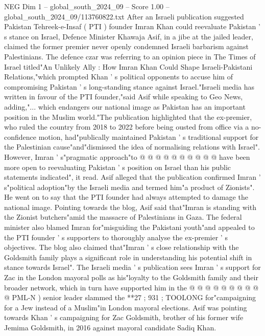 \begin{textsample}{NEG Dim 1 – global\_south\_2024\_09 – Score 1.00 – global\_south\_2024\_09/113760822.txt}  \label{ex:f1_neg_424}
After an Israeli publication suggested Pakistan Tehreek-e-Insaf ( PTI ) founder Imran Khan could reevaluate Pakistan ' s stance on Israel, Defence Minister Khawaja Asif, in a jibe at the jailed leader, claimed the former premier never openly condemned Israeli barbarism against Palestinians.
The defence czar was referring to an opinion piece in The Times of Israel titled"An Unlikely Ally : How Imran Khan Could Shape Israeli-Pakistani Relations,"which prompted Khan ' s political opponents to accuse him of compromising Pakistan ' s long-standing stance against Israel."Israeli media has written in favour of the PTI founder,"said Asif while speaking to Geo News, adding,"... which endangers our national image as Pakistan has an important position in the Muslim world."The publication highlighted that the ex-premier, who ruled the country from 2018 to 2022 before being ousted from office via a no-confidence motion, had"publically maintained Pakistan ' s traditional support for the Palestinian cause"and"dismissed the idea of normalising relations with Israel".
However, Imran ' s"pragmatic approach"to @ @ @ @ @ @ @ @ @ @ have been more open to reevaluating Pakistan ' s position on Israel than his public statements indicated", it read.
Asif alleged that the publication confirmed Imran ' s"political adoption"by the Israeli media and termed him"a product of Zionists".
He went on to say that the PTI founder had always attempted to damage the national image.
Pointing towards the blog, Asif said that"Imran is standing with the Zionist butchers"amid the massacre of Palestinians in Gaza.
The federal minister also blamed Imran for"misguiding the Pakistani youth"and appealed to the PTI founder ' s supporters to thoroughly analyse the ex-premier ' s objectives.
The blog also claimed that"Imran ' s close relationship with the Goldsmith family plays a significant role in understanding his potential shift in stance towards Israel".
The Israeli media ' s publication sees Imran ' s support for Zac in the London mayoral polls as his"loyalty to the Goldsmith family and their broader network, which in turn have supported him in the @ @ @ @ @ @ @ @ @ @ PML-N ) senior leader slammed the **27 ; 931 ; TOOLONG for"campaigning for a Jew instead of a Muslim"in London mayoral elections.
Asif was pointing towards Khan ' s campaigning for Zac Goldsmith, brother of his former wife Jemima Goldsmith, in 2016 against mayoral candidate Sadiq Khan.

\end{textsample}
